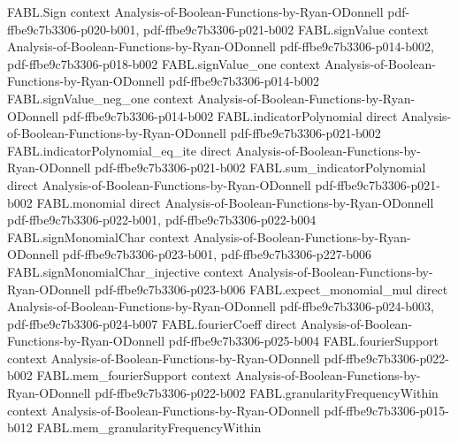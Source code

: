 \begin{theorem}
\label{FABL.abs_fourierCoeff_majority_two_mul_add_one}
\leanok
{}
\proofstep
  {FABL.Sign}
  {context}
  {Analysis-of-Boolean-Functions-by-Ryan-ODonnell}
  {pdf-ffbe9c7b3306-p020-b001,
    pdf-ffbe9c7b3306-p021-b002}
\proofstep
  {FABL.signValue}
  {context}
  {Analysis-of-Boolean-Functions-by-Ryan-ODonnell}
  {pdf-ffbe9c7b3306-p014-b002,
    pdf-ffbe9c7b3306-p018-b002}
\proofstep
  {FABL.signValue_one}
  {context}
  {Analysis-of-Boolean-Functions-by-Ryan-ODonnell}
  {pdf-ffbe9c7b3306-p014-b002}
\proofstep
  {FABL.signValue_neg_one}
  {context}
  {Analysis-of-Boolean-Functions-by-Ryan-ODonnell}
  {pdf-ffbe9c7b3306-p014-b002}
\proofstep
  {FABL.indicatorPolynomial}
  {direct}
  {Analysis-of-Boolean-Functions-by-Ryan-ODonnell}
  {pdf-ffbe9c7b3306-p021-b002}
\proofstep
  {FABL.indicatorPolynomial_eq_ite}
  {direct}
  {Analysis-of-Boolean-Functions-by-Ryan-ODonnell}
  {pdf-ffbe9c7b3306-p021-b002}
\proofstep
  {FABL.sum_indicatorPolynomial}
  {direct}
  {Analysis-of-Boolean-Functions-by-Ryan-ODonnell}
  {pdf-ffbe9c7b3306-p021-b002}
\proofstep
  {FABL.monomial}
  {direct}
  {Analysis-of-Boolean-Functions-by-Ryan-ODonnell}
  {pdf-ffbe9c7b3306-p022-b001,
    pdf-ffbe9c7b3306-p022-b004}
\proofstep
  {FABL.signMonomialChar}
  {context}
  {Analysis-of-Boolean-Functions-by-Ryan-ODonnell}
  {pdf-ffbe9c7b3306-p023-b001,
    pdf-ffbe9c7b3306-p227-b006}
\proofstep
  {FABL.signMonomialChar_injective}
  {context}
  {Analysis-of-Boolean-Functions-by-Ryan-ODonnell}
  {pdf-ffbe9c7b3306-p023-b006}
\proofstep
  {FABL.expect_monomial_mul}
  {direct}
  {Analysis-of-Boolean-Functions-by-Ryan-ODonnell}
  {pdf-ffbe9c7b3306-p024-b003,
    pdf-ffbe9c7b3306-p024-b007}
\proofstep
  {FABL.fourierCoeff}
  {direct}
  {Analysis-of-Boolean-Functions-by-Ryan-ODonnell}
  {pdf-ffbe9c7b3306-p025-b004}
\proofstep
  {FABL.fourierSupport}
  {context}
  {Analysis-of-Boolean-Functions-by-Ryan-ODonnell}
  {pdf-ffbe9c7b3306-p022-b002}
\proofstep
  {FABL.mem_fourierSupport}
  {context}
  {Analysis-of-Boolean-Functions-by-Ryan-ODonnell}
  {pdf-ffbe9c7b3306-p022-b002}
\proofstep
  {FABL.granularityFrequencyWithin}
  {context}
  {Analysis-of-Boolean-Functions-by-Ryan-ODonnell}
  {pdf-ffbe9c7b3306-p015-b012}
\proofstep
  {FABL.mem_granularityFrequencyWithin}

\end{theorem}
